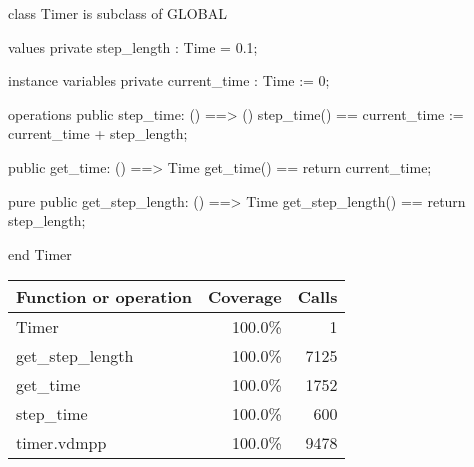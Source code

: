 \documentclass[a4paper]{article}
\begin{document}
\title{}
\author{}
\begin{vdm_al}
class Timer is subclass of GLOBAL

values 
    private step_length : Time = 0.1;

instance variables
    private current_time : Time := 0;

operations
    public step_time: () ==> ()
    step_time() == current_time := current_time + step_length;

    public get_time: () ==> Time
    get_time() == return current_time;

    pure public get_step_length: () ==> Time
    get_step_length() == return step_length;

end Timer
\end{vdm_al}
\bigskip
\begin{longtable}{|l|r|r|}
\hline
Function or operation & Coverage & Calls \\
\hline
\hline
Timer & 100.0\% & 1 \\
\hline
get\_step\_length & 100.0\% & 7125 \\
\hline
get\_time & 100.0\% & 1752 \\
\hline
step\_time & 100.0\% & 600 \\
\hline
\hline
timer.vdmpp & 100.0\% & 9478 \\
\hline
\end{longtable}
\end{document}
